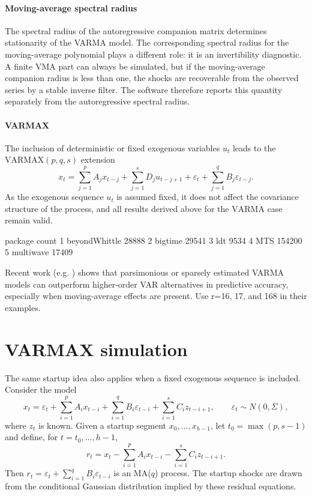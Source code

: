 \documentclass[a4paper,12pt]{extarticle} %
\begin{document}
\paragraph{Moving-average spectral radius}
The spectral radius of the autoregressive companion matrix determines
stationarity of the VARMA model. The corresponding spectral radius for the
moving-average polynomial plays a different role: it is an invertibility
diagnostic. A finite VMA part can always be simulated, but if the moving-average
companion radius is less than one, the shocks are recoverable from the observed
series by a stable inverse filter. The software therefore reports this quantity
separately from the autoregressive spectral radius.

\paragraph{VARMAX}
The inclusion of deterministic or fixed exogenous variables $u_t$ leads to the
$\mathrm{VARMAX}(p,q,s)$ extension
\begin{equation}
  x_t
  = \sum_{j=1}^{p} A_j x_{t-j}
  + \sum_{j=1}^{s} D_j u_{t-j+1}
  + \varepsilon_t
  + \sum_{j=1}^{q} B_j \varepsilon_{t-j}.
\end{equation}
As the exogenous sequence $u_t$ is assumed fixed, it does not affect the
covariance structure of the process, and all results derived above for the
$\mathrm{VARMA}$ case remain valid.

        package  count
1 beyondWhittle  28888
2       bigtime  29541
3           ldt   9534
4           MTS 154200
5     multiwave  17409


Recent work (e.g. \citet{wilms2021bigtime}) shows that parsimonious or sparsely
estimated VARMA models can outperform higher-order VAR alternatives in
predictive accuracy, especially when moving-average effects are present. Use
r=16, 17, and 168 in their examples.

\section{VARMAX simulation}
The same startup idea also applies when a fixed exogenous sequence is included.
Consider the model
%
\begin{equation}
  x_t =
  \varepsilon_t
  + \sum_{i=1}^p A_i x_{t-i}
  + \sum_{i=1}^q B_i \varepsilon_{t-i}
  + \sum_{i=1}^s C_i z_{t-i+1},
  \qquad
  \varepsilon_t \sim N(0,\Sigma),
\end{equation}
%
where $z_t$ is known. Given a startup segment $x_0,\ldots,x_{h-1}$, let
$t_0=\max(p,s-1)$ and define, for $t=t_0,\ldots,h-1$,
%
\begin{equation}
  r_t =
  x_t
  - \sum_{i=1}^p A_i x_{t-i}
  - \sum_{i=1}^s C_i z_{t-i+1}.
\end{equation}
%
Then $r_t=\varepsilon_t+\sum_{i=1}^q B_i\varepsilon_{t-i}$ is an MA($q$)
process. The startup shocks are drawn from the conditional Gaussian
distribution implied by these residual equations.
\end{document}

